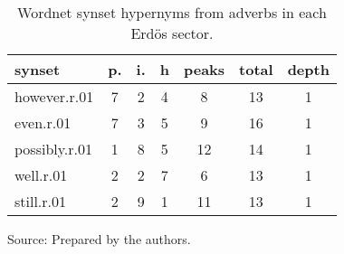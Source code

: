 \begin{table}[h!]
\begin{center}
\caption{Wordnet synset hypernyms from adverbs in each Erd\"os sector.}
	\label{tab:wnrh}
\begin{tabular}{| l || c | c | c || c | c | c |}\hline
{\bf synset} & {\bf p.} & {\bf i.} & {\bf h} & {\bf peaks} & {\bf total} & {\bf depth} \\\hline\hline
however.r.01 & 7  & 2  & 4  & 8  & 13  & 1 \\
even.r.01 & 7  & 3  & 5  & 9  & 16  & 1 \\
possibly.r.01 & 1  & 8  & 5  & 12  & 14  & 1 \\
well.r.01 & 2  & 2  & 7  & 6  & 13  & 1 \\
still.r.01 & 2  & 9  & 1  & 11  & 13  & 1 \\\hline
\end{tabular}
\begin{flushleft}
		Source: Prepared by the authors.\
\end{flushleft}
\end{center}
\end{table}
